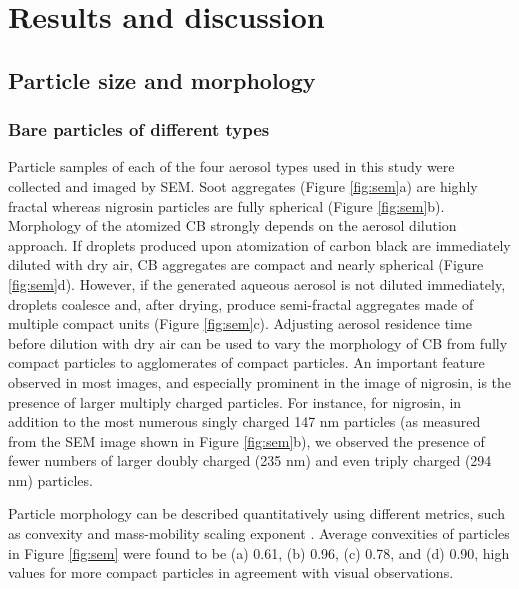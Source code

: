 \documentclass[12pt,authoryear]{elsarticle}
\begin{document}
\section{Results and discussion}
\subsection{Particle size and morphology}

\subsubsection{Bare particles of different types}

Particle samples of each of the four aerosol types used in this study were collected and imaged by SEM. Soot aggregates (Figure \ref{fig:sem}a) are highly fractal whereas nigrosin particles are fully spherical (Figure \ref{fig:sem}b). Morphology of the atomized CB strongly depends on the aerosol dilution approach. If droplets produced upon atomization of carbon black are immediately diluted with dry air, CB aggregates are compact and nearly spherical (Figure \ref{fig:sem}d). However, if the generated aqueous aerosol is not diluted immediately, droplets coalesce and, after drying, produce semi-fractal aggregates made of multiple compact units (Figure \ref{fig:sem}c). Adjusting aerosol residence time before dilution with dry air can be used to vary the morphology of CB from fully compact particles to agglomerates of compact particles. An important feature observed in most images, and especially prominent in the image of nigrosin, is the presence of larger multiply charged particles. For instance, for nigrosin, in addition to the most numerous singly charged 147 nm particles (as measured from the SEM image shown in Figure \ref{fig:sem}b), we observed the presence of fewer numbers of larger doubly charged (235 nm) and even triply charged (294 nm) particles. 

Particle morphology can be described quantitatively using different metrics, such as convexity and mass-mobility scaling exponent \citep{RN69}. Average convexities of particles in Figure \ref{fig:sem} were found to be (a) 0.61, (b) 0.96, (c) 0.78, and (d) 0.90, high values for more compact particles in agreement with visual observations.
\end{document}
